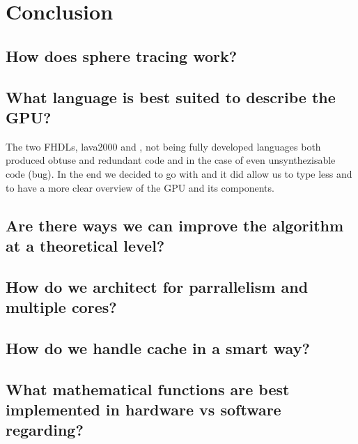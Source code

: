 \chapter{Conclusion}
	\section{How does sphere tracing work?}

	\section{What language is best suited to describe the GPU?}
	
	The two FHDLs, lava2000 and \clash, not being fully developed languages both produced obtuse and redundant code and in the case of \clash even unsynthezisable code (bug). In the end we decided to go with \clash and it did allow us to type less and to have a more clear overview of the GPU and its components.

	\section{Are there ways we can improve the algorithm at a theoretical level?}



	\section{How do we architect for parrallelism and multiple cores?}

	\section{How do we handle cache in a smart way?}

	\section{What mathematical functions are best implemented in hardware vs software regarding?}